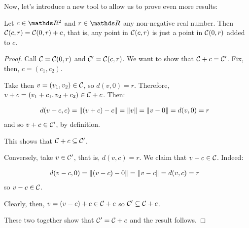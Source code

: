 Now, let's introduce a new tool to allow us to prove even more results:



\begin{lemma}
	Let $c\in \R^2$ and $r\in \R$ any non-negative real number. Then $\mathcal C(c,r)=\mathcal C(0,r)+c$, that is, any point in $\mathcal C(c,r)$ is just a point in $\mathcal C(0,r)$ added to $c$.
\end{lemma}
\begin{proof}
	Call $\mathcal C=\mathcal C(0,r)$ and $\mathcal C'= \mathcal C(c,r)$. We want to show that $\mathcal C+c=\mathcal C'$. Fix, then, $c=(c_1,c_2)$.
	
	Take then $v=(v_1,v_2)\in \mathcal C$, so $d(v,0)=r$. Therefore, $v+c=(v_1+c_1,v_2+c_2)\in \mathcal C+c$. Then:
	
	\begin{align*}
		d(v+c,c)&=\lVert(v+c)-c\rVert=\lVert v\rVert=\lVert v-0\rVert=d(v,0)=r
	\end{align*}and so $v+c\in \mathcal C'$, by definition.
	
	This shows that $\mathcal C+c\subseteq \mathcal C'$.
	
	\bigskip
	Conversely, take $v\in \mathcal C'$, that is, $d(v,c)=r$. We claim that $v-c\in \mathcal C$. Indeed:
	
	\begin{align*}
		d(v-c,0)&=\lVert(v-c)-0\rVert=\lVert v-c\rVert=d(v,c)=r
	\end{align*}so $v-c\in \mathcal C$.
	
	Clearly, then, $v=(v-c)+c\in \mathcal C+c$ so $\mathcal C'\subseteq \mathcal C+c$.
	
	These two together show that $\mathcal C'=\mathcal C+c$ and the result follows.
\end{proof}



